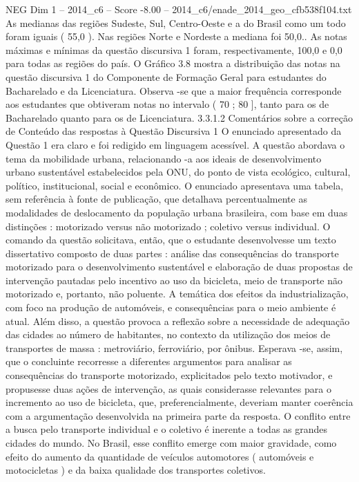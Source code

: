 \begin{textsample}{NEG Dim 1 – 2014\_c6 – Score -8.00 – 2014\_c6/enade\_2014\_geo\_cfb538f104.txt}
As medianas das regiões Sudeste, Sul, Centro-Oeste e a do Brasil como um todo foram iguais ( 55,0 ).
Nas regiões Norte e Nordeste a mediana foi 50,0..
As notas máximas e mínimas da questão discursiva 1 foram, respectivamente, 100,0 e 0,0 para todas as regiões do país.
O Gráfico 3.8 mostra a distribuição das notas na questão discursiva 1 do Componente de Formação Geral para estudantes do Bacharelado e da Licenciatura.
Observa -se que a maior frequência corresponde aos estudantes que obtiveram notas no intervalo ( 70 ; 80 ], tanto para os de Bacharelado quanto para os de Licenciatura. 3.3.1.2 Comentários sobre a correção de Conteúdo das respostas à Questão Discursiva 1 O enunciado apresentado da Questão 1 era claro e foi redigido em linguagem acessível.
A questão abordava o tema da mobilidade urbana, relacionando -a aos ideais de desenvolvimento urbano sustentável estabelecidos pela ONU, do ponto de vista ecológico, cultural, político, institucional, social e econômico.
O enunciado apresentava uma tabela, sem referência à fonte de publicação, que detalhava percentualmente as modalidades de deslocamento da população urbana brasileira, com base em duas distinções : motorizado versus não motorizado ; coletivo versus individual.
O comando da questão solicitava, então, que o estudante desenvolvesse um texto dissertativo composto de duas partes : análise das consequências do transporte motorizado para o desenvolvimento sustentável e elaboração de duas propostas de intervenção pautadas pelo incentivo ao uso da bicicleta, meio de transporte não motorizado e, portanto, não poluente.
A temática dos efeitos da industrialização, com foco na produção de automóveis, e consequências para o meio ambiente é atual.
Além disso, a questão provoca a reflexão sobre a necessidade de adequação das cidades ao número de habitantes, no contexto da utilização dos meios de transportes de massa : metroviário, ferroviário, por ônibus.
Esperava -se, assim, que o concluinte recorresse a diferentes argumentos para analisar as consequências do transporte motorizado, explicitados pelo texto motivador, e propusesse duas ações de intervenção, as quais considerasse relevantes para o incremento ao uso de bicicleta, que, preferencialmente, deveriam manter coerência com a argumentação desenvolvida na primeira parte da resposta.
O conflito entre a busca pelo transporte individual e o coletivo é inerente a todas as grandes cidades do mundo.
No Brasil, esse conflito emerge com maior gravidade, como efeito do aumento da quantidade de veículos automotores ( automóveis e motocicletas ) e da baixa qualidade dos transportes coletivos.

\end{textsample}
